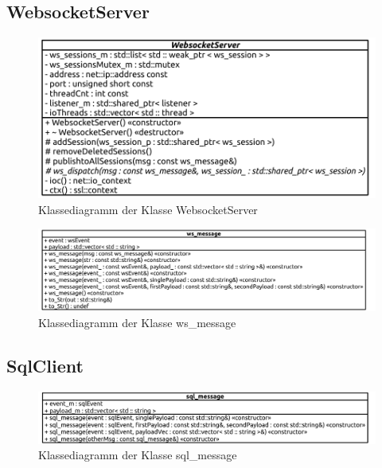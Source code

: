 \subsection{WebsocketServer}
\begin{figure}[ht]
  \centering
  \includegraphics[width=\textwidth]{content/hauptteil/umsetzungPoC/backend/uml/classesOfOverview/WebsocketServer.pdf}
  \caption{Klassediagramm der Klasse WebsocketServer}
  \label{fig:backend:classDiag:WebsocketServer}
\end{figure}
\begin{figure}[ht]
  \centering
  \includegraphics[width=\textwidth]{content/hauptteil/umsetzungPoC/backend/uml/classesOfOverview/ws_message.pdf}
  \caption{Klassediagramm der Klasse ws\_message}
  \label{fig:backend:classDiag:wsMsg}
\end{figure}
\subsection{SqlClient}
\begin{figure}[ht]
  \centering
  \includegraphics[width=\textwidth]{content/hauptteil/umsetzungPoC/backend/uml/classesOfOverview/sql_message.pdf}
  \caption{Klassediagramm der Klasse sql\_message}
  \label{fig:backend:classDiag:sqlMsg}
\end{figure}

